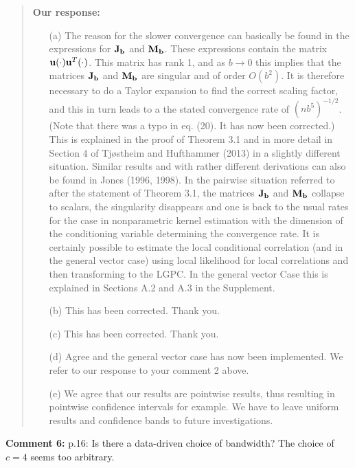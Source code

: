 \documentclass[
  12pt,
  letterpaper]{article}
\numberwithin{equation}{section}
\begin{document}
\begin{quote}
\textbf{Our response:}

\begin{itemize}
\item[(a)] The reason for the slower convergence can basically be found in the expressions for ${\bf J}_{\bf b}$ and ${\bf M}_{\bf b}$. These expressions contain the matrix ${\bf u}(\cdot) {\bf u}^T(\cdot)$. This matrix has rank 1, and as $b \to 0$ this implies that the matrices ${\bf J}_{\bf b}$ and ${\bf M}_{\bf b}$ are singular and of order $O(b^2)$. It is therefore necessary to do a Taylor expansion to find the correct scaling factor, and this in turn leads to a the stated convergence rate of $(nb^5)^{-1/2}$. (Note that there was a typo in eq. (20). It has now been corrected.) This is explained in the proof of Theorem 3.1 and in more detail in Section 4 of Tj{\o}stheim and Hufthammer (2013)  in  a slightly different situation. Similar results and with  rather different derivations can also be found in Jones (1996, 1998). In the pairwise situation referred to after the statement of Theorem 3.1, the matrices ${\bf J}_{\bf b}$ and ${\bf M}_{\bf b}$ collapse to scalars, the singularity disappears and one is back to the usual rates for the case in nonparametric kernel estimation with the dimension of the conditioning variable determining the convergence rate.
\vspace{.3cm} \newline It is certainly possible to estimate the local conditional correlation (and in the general vector case) using local likelihood for local correlations and then transforming to the LGPC. In the general vector Case this is explained in Sections A.2 and A.3 in the Supplement.
\item[(b)] This has been corrected. Thank you.
\item[(c)] This has been corrected. Thank you.
\item[(d)] Agree and the general vector case has now been implemented. We refer to our response to your comment 2 above.
\item[(e)] We agree that our results are pointwise results, thus resulting in pointwise confidence intervals for example. We have to leave uniform results and confidence bands to future investigations.
\end{itemize}
\end{quote}

\textbf{Comment 6:} p.16: Is there a data-driven choice of bandwidth? The choice of \(c=4\) seems too arbitrary.
\end{document}
